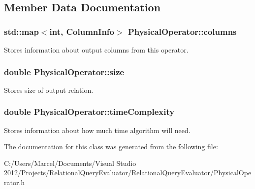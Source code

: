 \subsection{Member Data Documentation}
\hypertarget{class_physical_operator_aaf7e49cbadd48e7b0b30e9a84367e5de}{
\subsubsection[{columns}]{\setlength{\rightskip}{0pt plus 5cm}std\+::map$<$int, {\bf Column\+Info}$>$ Physical\+Operator\+::columns}}\label{class_physical_operator_aaf7e49cbadd48e7b0b30e9a84367e5de}
Stores information about output columns from this operator. \hypertarget{class_physical_operator_a744971579c457601553e8e9a70a5cee1}{
\subsubsection[{size}]{\setlength{\rightskip}{0pt plus 5cm}double Physical\+Operator\+::size}}\label{class_physical_operator_a744971579c457601553e8e9a70a5cee1}
Stores size of output relation. \hypertarget{class_physical_operator_a88836a2b6453889b6ad852a2121ca512}{
\subsubsection[{time\+Complexity}]{\setlength{\rightskip}{0pt plus 5cm}double Physical\+Operator\+::time\+Complexity}}\label{class_physical_operator_a88836a2b6453889b6ad852a2121ca512}
Stores information about how much time algorithm will need. 

The documentation for this class was generated from the following file\+:\begin{DoxyCompactItemize}
\item 
C\+:/\+Users/\+Marcel/\+Documents/\+Visual Studio 2012/\+Projects/\+Relational\+Query\+Evaluator/\+Relational\+Query\+Evaluator/Physical\+Operator.\+h\end{DoxyCompactItemize}
